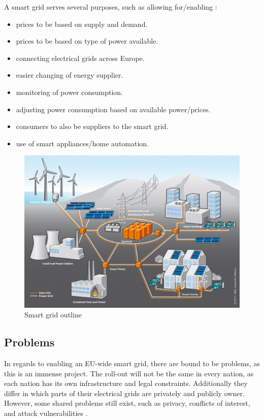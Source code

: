 A smart grid serves several purposes, such as allowing for/enabling \cite{smartgrid_gov, directive_2009_72_EC}:
\begin{itemize}
	\item prices to be based on supply and demand.
	\item prices to be based on type of power available.
	\item connecting electrical grids across Europe.
	\item easier changing of energy supplier.
	\item monitoring of power consumption.
	\item adjusting power consumption based on available power/prices.
	\item consumers to also be suppliers to the smart grid.
	\item use of smart appliances/home automation.
\end{itemize}

\begin{figure}
	\includegraphics[width=\textwidth]{figures/SmartGrid_Ueberblick_ohneLegende.jpg}
	\caption{Smart grid outline\protect\footnotemark}
	\label{fig:background:smartgrid}
\end{figure}

\subsection{Problems}
In regards to enabling an EU-wide smart grid, there are bound to be problems, as this is an immense project.
The roll-out will not be the same in every nation, as each nation has its own infrastructure and legal constraints.
Additionally they differ in which parts of their electrical grids are privately and publicly owner.
However, some shared problems still exist, such as privacy, conflicts of interest, and attack vulnerabilities \cite{offswitch, smart_meter_survey, security_economics}.

